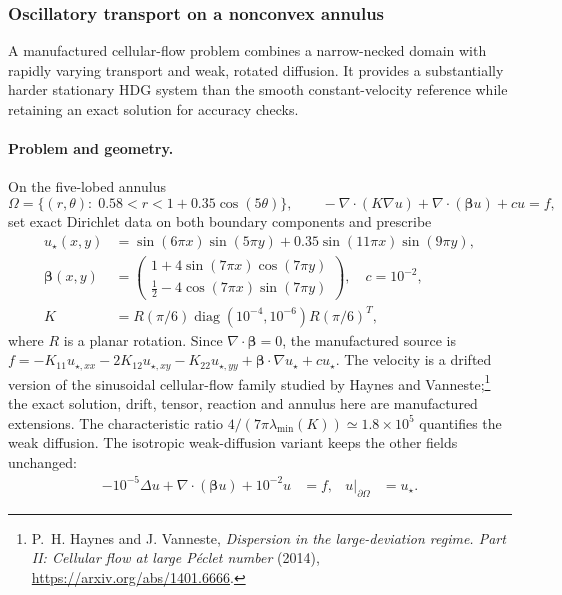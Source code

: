 \providecommand{\ADRStressPath}{docs/research/solver_studies/adr_scaling_2026_09_17/oscillatory/initial}
\providecommand{\ADRStressFigurePath}{run_outputs/solver_studies/adr_scaling_2026_09_17/oscillatory/initial/figures}
\subsubsection{Oscillatory transport on a nonconvex annulus}
\label{sec:adr-oscillatory}

A manufactured cellular-flow problem combines a narrow-necked domain with
rapidly varying transport and weak, rotated diffusion. It provides a substantially
harder stationary HDG system than the smooth constant-velocity reference while
retaining an exact solution for accuracy checks.

\paragraph{Problem and geometry.}
On the five-lobed annulus
\begin{equation}
 \Omega=\{(r,\theta):\;0.58<r<1+0.35\cos(5\theta)\},
 \qquad -\nabla\!\cdot(K\nabla u)+\nabla\!\cdot(\boldsymbol\beta u)+c u=f,
 \label{eq:adr-stress-domain}
\end{equation}
set exact Dirichlet data on both boundary components and prescribe
\begin{align}
 u_\star(x,y)&=\sin(6\pi x)\sin(5\pi y)
               +0.35\sin(11\pi x)\sin(9\pi y),\label{eq:adr-stress-exact}\\
 \boldsymbol\beta(x,y)&=
 \begin{pmatrix}1+4\sin(7\pi x)\cos(7\pi y)\\
                 \tfrac12-4\cos(7\pi x)\sin(7\pi y)\end{pmatrix},
 \quad c=10^{-2},\label{eq:adr-stress-velocity}\\
 K&=R(\pi/6)\operatorname{diag}(10^{-4},10^{-6})R(\pi/6)^T,
 \label{eq:adr-stress-tensor}
\end{align}
where $R$ is a planar rotation. Since $\nabla\!\cdot\boldsymbol\beta=0$, the
manufactured source is
$f=-K_{11}u_{\star,xx}-2K_{12}u_{\star,xy}-K_{22}u_{\star,yy}
+\boldsymbol\beta\cdot\nabla u_\star+c u_\star$.
The velocity is a drifted version of the sinusoidal cellular-flow family studied
by Haynes and Vanneste;\footnote{P.~H. Haynes and J. Vanneste,
\emph{Dispersion in the large-deviation regime. Part II: Cellular flow at large
P\'eclet number} (2014), \url{https://arxiv.org/abs/1401.6666}.}
the exact solution, drift, tensor, reaction and annulus here are manufactured
extensions. The characteristic ratio $4/(7\pi\lambda_{\min}(K))\simeq1.8\times10^5$
quantifies the weak diffusion. The isotropic weak-diffusion variant keeps the other fields unchanged:
\begin{equation}
 \begin{aligned}
 -10^{-5}\Delta u+\nabla\cdot(\boldsymbol\beta u)+10^{-2}u&=f,
 &u|_{\partial\Omega}&=u_\star.
 \end{aligned}
 \label{eq:adr-stress-isotropic}
\end{equation}

